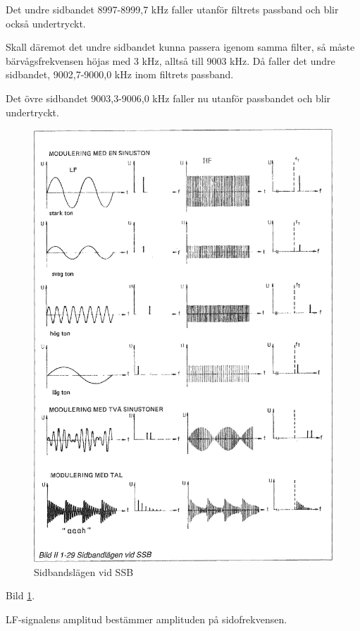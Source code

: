Det undre sidbandet 8997-8999,7 kHz faller utanför filtrets passband och blir
också undertryckt.

Skall däremot det undre sidbandet kunna passera igenom samma filter, så måste
bärvågsfrekvensen höjas med 3 kHz, alltså till 9003 kHz. Då faller det undre
sidbandet, 9002,7-9000,0 kHz inom filtrets passband.

Det övre sidbandet 9003,3-9006,0 kHz faller nu utanför passbandet och blir
undertryckt.

\begin{figure}
\includegraphics[width=\textwidth]{images/bild_2_1-29}
\caption{Sidbandslägen vid SSB}
\label{fig:BildII1-29}
\end{figure}

Bild \ref{fig:BildII1-29}.

LF-signalens amplitud bestämmer amplituden på sidofrekvensen.

